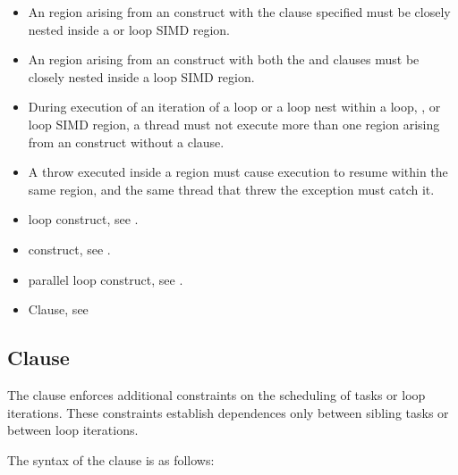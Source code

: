 {{{{\begin{itemize}
\item An  region arising from an  construct with
the  clause specified must be closely nested inside a
 or loop SIMD region.

\item An  region arising from an  construct with
  both the  and  clauses must be closely nested inside
  a loop SIMD region.
  
\item During execution of an iteration of a loop or a loop nest within a loop, , or loop SIMD
region, a thread must not execute more than one  region arising
from an  construct without a  clause. 
\end{itemize}
\cppspecificstart
\begin{itemize}
\item A throw executed inside a  region must cause execution to 
resume within the same  region, and the same thread that threw 
the exception must catch it.
\end{itemize}
\cppspecificend



\crossreferences
\begin{itemize}
\item loop construct, see 
.

\item {} construct, see
.

\item parallel loop construct, see 
.

\item {} Clause, see
\end{itemize}


\subsection{ Clause}
\label{subsec:depend Clause}
\summary
The  clause enforces additional constraints on the scheduling of tasks or loop iterations.  These 
constraints establish dependences only between sibling tasks or between loop iterations. 

\syntax
The syntax of the  clause is as follows:

}}}}
